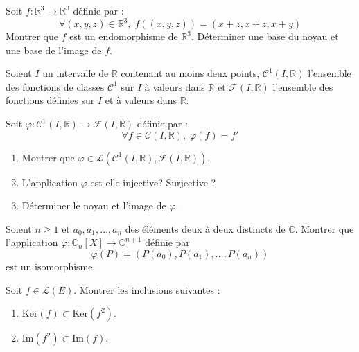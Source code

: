 \documentclass[a4paper,twoside,french,11pt]{VcCours}
\begin{document}
\begin{Exercice}{}
  Soit $f : \mathbb{R}^3 \rightarrow \mathbb{R}^3$ définie par :
  $$ \forall (x,y,z) \in \mathbb{R}^3, \; f((x,y,z))= (x+z,x+z,x+y)$$
  Montrer que $f$ est un endomorphisme de $\mathbb{R}^3$. Déterminer une base du noyau et une base de l'image de $f$.
\end{Exercice} 

\begin{Exercice}{}
  Soient $I$ un intervalle de $\mathbb{R}$ contenant au moins deux points,  $\mathcal{C}^1(I, \mathbb{R})$ l'ensemble des fonctions de classes $\mathcal{C}^1$ sur $I$ à valeurs dans $\mathbb{R}$ et $\mathcal{F}(I, \mathbb{R})$ l'ensemble des fonctions définies sur $I$ et à valeurs dans $\mathbb{R}$. 
  
  Soit $\varphi : \mathcal{C}^1(I, \mathbb{R}) \rightarrow \mathcal{F}(I, \mathbb{R})$ définie par :
  $$ \forall f \in \mathcal{C}(I, \mathbb{R}), \; \varphi(f)=f'$$
  
  \begin{enumerate}
    \item Montrer que $\varphi \in \mathcal{L}(\mathcal{C}^1(I, \mathbb{R}),\mathcal{F}(I, \mathbb{R}))$.
    \item L'application $\varphi$ est-elle injective? Surjective ?
    \item Déterminer le noyau et l'image de $\varphi$.
  \end{enumerate}
\end{Exercice} 

\begin{Exercice}{}
  Soient $n \geq 1$ et $a_{0} ,a_{1} , \ldots ,a_{n}$ des éléments deux à deux distincts de $\mathbb{C}$. Montrer que l'application $\varphi \colon \mathbb{C}_n[X] \rightarrow \mathbb{C}^{n+1}$ définie par
  \[\varphi(P) = (P(a_{0}),P(a_{1}), \ldots ,P(a_{n}))\]
  est un isomorphisme.
\end{Exercice} 
    
\begin{Exercice}{}
  Soit $f \in \mathcal{L}(E)$. Montrer les inclusions suivantes :
  
  \begin{enumerate}
    \item $\textrm{Ker}(f) \subset \textrm{Ker}(f^2)$.
    \item $\textrm{Im}(f^2) \subset \textrm{Im}(f)$.
  \end{enumerate}
\end{Exercice} 
\end{document}
